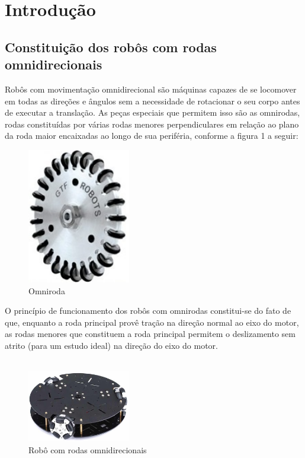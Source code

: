 \documentclass{article}
\begin{document}
\tableofcontents
\newpage

\section{Introdução}
\subsection{Constituição dos robôs com rodas omnidirecionais}

\hspace{1cm} Robôs com movimentação omnidirecional são máquinas capazes de se locomover em todas as direções e ângulos sem a necessidade de rotacionar o seu corpo antes de executar a translação. As peças especiais que permitem isso são as omnirodas, rodas constituídas por várias rodas menores perpendiculares em relação ao plano da roda maior encaixadas ao longo de sua periféria, conforme a figura 1 a seguir:

\begin{figure}[H]
\centering
\includegraphics[width=0.4\textwidth]{omniroda.jpeg}
\caption{Omniroda}
\label{Figura 1}
\end{figure}

O princípio de funcionamento dos robôs com omnirodas constitui-se do fato de que, enquanto a roda principal provê tração na direção normal ao eixo do motor, as rodas menores que constituem a roda principal permitem o deslizamento sem atrito (para um estudo ideal) na direção do eixo do motor.\\ \\

\begin{figure}[H]
\centering
\includegraphics[width=0.4\textwidth]{robo.jpeg}
\caption{Robô com rodas omnidirecionais}
\label{Rotulo}
\end{figure}
\end{document}
